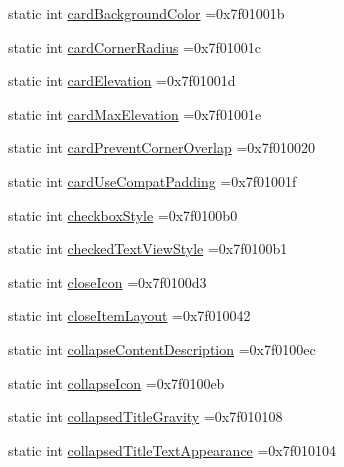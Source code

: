 \begin{DoxyCompactItemize}
static int \hyperlink{classandroid_1_1support_1_1design_1_1R_1_1attr_a1328a32ea9c593fc1f8a1a0b6f19e84e}{card\+Background\+Color} =0x7f01001b
\item 
static int \hyperlink{classandroid_1_1support_1_1design_1_1R_1_1attr_a0892312691f51ddd1d073df8df17e82a}{card\+Corner\+Radius} =0x7f01001c
\item 
static int \hyperlink{classandroid_1_1support_1_1design_1_1R_1_1attr_a98e65155e8f567fb4f1f99d3cef046d2}{card\+Elevation} =0x7f01001d
\item 
static int \hyperlink{classandroid_1_1support_1_1design_1_1R_1_1attr_a4ab552f9212cc7ca0ffa111487bc3924}{card\+Max\+Elevation} =0x7f01001e
\item 
static int \hyperlink{classandroid_1_1support_1_1design_1_1R_1_1attr_a550a939ee685a91fd5d5842fefc73113}{card\+Prevent\+Corner\+Overlap} =0x7f010020
\item 
static int \hyperlink{classandroid_1_1support_1_1design_1_1R_1_1attr_a183c5ee389982503b56ef6304d75d768}{card\+Use\+Compat\+Padding} =0x7f01001f
\item 
static int \hyperlink{classandroid_1_1support_1_1design_1_1R_1_1attr_a872314306a26ac20bfcc115120e40dd5}{checkbox\+Style} =0x7f0100b0
\item 
static int \hyperlink{classandroid_1_1support_1_1design_1_1R_1_1attr_a434948ae3f1dd8ba90cfe1ebc224b6cc}{checked\+Text\+View\+Style} =0x7f0100b1
\item 
static int \hyperlink{classandroid_1_1support_1_1design_1_1R_1_1attr_a5e570f928d1b026dd3dca79dcefa05cc}{close\+Icon} =0x7f0100d3
\item 
static int \hyperlink{classandroid_1_1support_1_1design_1_1R_1_1attr_afdbc1658d4339331fec2a26f7f7c3ac6}{close\+Item\+Layout} =0x7f010042
\item 
static int \hyperlink{classandroid_1_1support_1_1design_1_1R_1_1attr_aa5754fb1f9395624cc050bbc138cd96d}{collapse\+Content\+Description} =0x7f0100ec
\item 
static int \hyperlink{classandroid_1_1support_1_1design_1_1R_1_1attr_ab780800888c8f742b7139b48235b7ff7}{collapse\+Icon} =0x7f0100eb
\item 
static int \hyperlink{classandroid_1_1support_1_1design_1_1R_1_1attr_accb70e3f5023e816de65788d2484b73b}{collapsed\+Title\+Gravity} =0x7f010108
\item 
static int \hyperlink{classandroid_1_1support_1_1design_1_1R_1_1attr_a1ad0c01d0351c460d4cee0ba2b6ed855}{collapsed\+Title\+Text\+Appearance} =0x7f010104
\item 

\end{DoxyCompactItemize}
